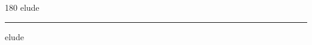
\begin{frame}
\begin{center}
\begin{turn}{180}
{\fontsize{2.5cm}{1em}\selectfont elude}
\end{turn}
\vspace{1em}\par  
\hrule
\vspace{1em}\par  
{\fontsize{2.5cm}{1em}\selectfont elude}
\end{center}
\end{frame}
